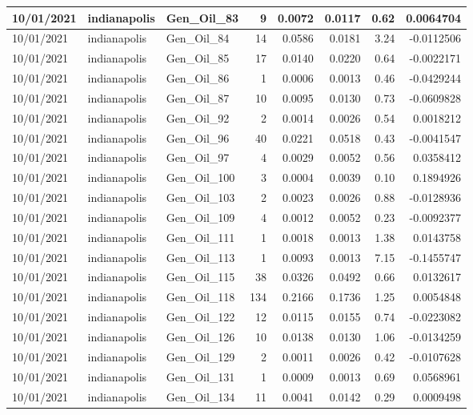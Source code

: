 \documentclass[
  letterpaper,
  DIV=11,
  numbers=noendperiod]{scrartcl}
\begin{document}
\begin{tabular}{l|l|l|r|r|r|r|r}
\hline
10/01/2021 & indianapolis & Gen\_Oil\_83 & 9 & 0.0072 & 0.0117 & 0.62 & 0.0064704\\
\hline
10/01/2021 & indianapolis & Gen\_Oil\_84 & 14 & 0.0586 & 0.0181 & 3.24 & -0.0112506\\
\hline
10/01/2021 & indianapolis & Gen\_Oil\_85 & 17 & 0.0140 & 0.0220 & 0.64 & -0.0022171\\
\hline
10/01/2021 & indianapolis & Gen\_Oil\_86 & 1 & 0.0006 & 0.0013 & 0.46 & -0.0429244\\
\hline
10/01/2021 & indianapolis & Gen\_Oil\_87 & 10 & 0.0095 & 0.0130 & 0.73 & -0.0609828\\
\hline
10/01/2021 & indianapolis & Gen\_Oil\_92 & 2 & 0.0014 & 0.0026 & 0.54 & 0.0018212\\
\hline
10/01/2021 & indianapolis & Gen\_Oil\_96 & 40 & 0.0221 & 0.0518 & 0.43 & -0.0041547\\
\hline
10/01/2021 & indianapolis & Gen\_Oil\_97 & 4 & 0.0029 & 0.0052 & 0.56 & 0.0358412\\
\hline
10/01/2021 & indianapolis & Gen\_Oil\_100 & 3 & 0.0004 & 0.0039 & 0.10 & 0.1894926\\
\hline
10/01/2021 & indianapolis & Gen\_Oil\_103 & 2 & 0.0023 & 0.0026 & 0.88 & -0.0128936\\
\hline
10/01/2021 & indianapolis & Gen\_Oil\_109 & 4 & 0.0012 & 0.0052 & 0.23 & -0.0092377\\
\hline
10/01/2021 & indianapolis & Gen\_Oil\_111 & 1 & 0.0018 & 0.0013 & 1.38 & 0.0143758\\
\hline
10/01/2021 & indianapolis & Gen\_Oil\_113 & 1 & 0.0093 & 0.0013 & 7.15 & -0.1455747\\
\hline
10/01/2021 & indianapolis & Gen\_Oil\_115 & 38 & 0.0326 & 0.0492 & 0.66 & 0.0132617\\
\hline
10/01/2021 & indianapolis & Gen\_Oil\_118 & 134 & 0.2166 & 0.1736 & 1.25 & 0.0054848\\
\hline
10/01/2021 & indianapolis & Gen\_Oil\_122 & 12 & 0.0115 & 0.0155 & 0.74 & -0.0223082\\
\hline
10/01/2021 & indianapolis & Gen\_Oil\_126 & 10 & 0.0138 & 0.0130 & 1.06 & -0.0134259\\
\hline
10/01/2021 & indianapolis & Gen\_Oil\_129 & 2 & 0.0011 & 0.0026 & 0.42 & -0.0107628\\
\hline
10/01/2021 & indianapolis & Gen\_Oil\_131 & 1 & 0.0009 & 0.0013 & 0.69 & 0.0568961\\
\hline
10/01/2021 & indianapolis & Gen\_Oil\_134 & 11 & 0.0041 & 0.0142 & 0.29 & 0.0009498\\

\end{tabular}
\end{document}
